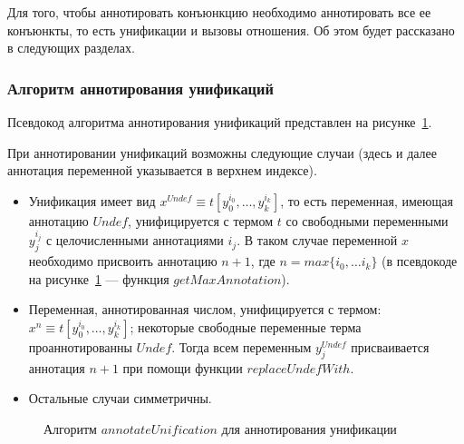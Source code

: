 Для того, чтобы аннотировать конъюнкцию необходимо аннотировать все ее конъюнкты, то есть унификации и вызовы отношения.
Об этом будет рассказано в следующих разделах.

\subsubsection{Алгоритм аннотирования унификаций}

Псевдокод алгоритма аннотирования унификаций представлен на рисунке~\ref{alg:annotateUnification}.

При аннотировании унификаций возможны следующие случаи (здесь и далее аннотация переменной указывается в верхнем индексе).
\begin{itemize}
    \item Унификация имеет вид $x^{Undef} \equiv t[y_0^{i_0}, \dots, y_k^{i_k}]$, то есть переменная, имеющая аннотацию $Undef$, унифицируется с термом $t$ со свободными переменными $y_j^{i_j}$ с целочисленными аннотациями $i_j$. В таком случае переменной $x$ необходимо присвоить аннотацию $n + 1$, где $n = max \{ i_0, \dots i_k\}$ (в псевдокоде на рисунке~\ref{alg:annotateUnification} --- функция $getMaxAnnotation$).
    \item Переменная, аннотированная числом, унифицируется с термом: $x^{n} \equiv t[y_0^{i_0}, \dots, y_k^{i_k}]$; некоторые свободные переменные терма проаннотированны $Undef$.
    Тогда всем переменным $y_j^{Undef}$ присваивается аннотация $n+1$ при помощи функции $replaceUndefWith$.
    \item Остальные случаи симметричны.
\end{itemize}

\begin{figure}[h!]
  \begin{center}
  \begin{minipage}{1\textwidth}
\begin{algorithm}[H]
\end{algorithm}
  \end{minipage}
  \end{center}
  \caption{Алгоритм $annotateUnification$ для аннотирования унификации}
  \label{alg:annotateUnification}
\end{figure}

